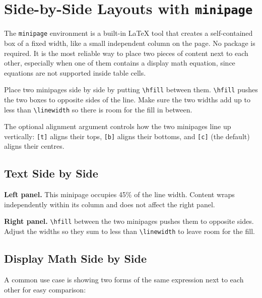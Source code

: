 \newpage
\section{Side-by-Side Layouts with \texttt{minipage}}

The \texttt{minipage} environment is a built-in \LaTeX{} tool that creates a self-contained box of a fixed width, like a small independent column on the page. No package is required. It is the most reliable way to place two pieces of content next to each other, especially when one of them contains a display math equation, since equations are not supported inside table cells.

Place two minipages side by side by putting \texttt{\textbackslash hfill} between them. \texttt{\textbackslash hfill} pushes the two boxes to opposite sides of the line. Make sure the two widths add up to less than \texttt{\textbackslash linewidth} so there is room for the fill in between.

The optional alignment argument controls how the two minipages line up vertically: \texttt{[t]} aligns their tops, \texttt{[b]} aligns their bottoms, and \texttt{[c]} (the default) aligns their centres.

\subsection{Text Side by Side}

\noindent
\begin{minipage}[t]{0.45\linewidth}
	\textbf{Left panel.} This minipage occupies 45\% of the line width. Content
	wraps independently within its column and does not affect the right panel.
\end{minipage}
\hfill
\begin{minipage}[t]{0.45\linewidth}
	\textbf{Right panel.} \texttt{\textbackslash hfill} between the two minipages
	pushes them to opposite sides. Adjust the widths so they sum to less than
	\texttt{\textbackslash linewidth} to leave room for the fill.
\end{minipage}

\subsection{Display Math Side by Side}

A common use case is showing two forms of the same expression next to each other for easy comparison:


